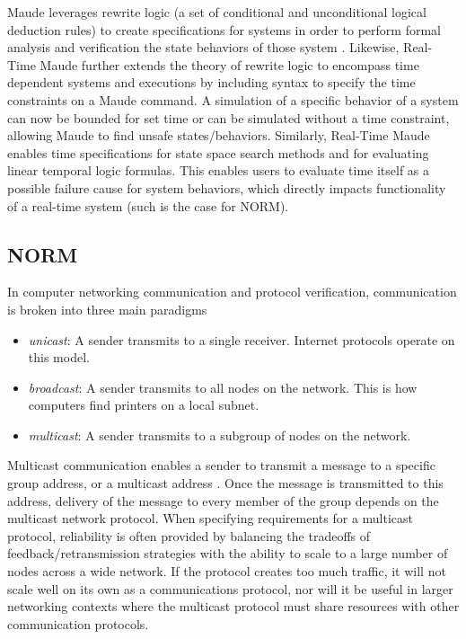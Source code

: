 \documentclass[10pt, journal]{IEEEtran}
\begin{document}
Maude leverages rewrite logic (a set of conditional and unconditional logical deduction rules) to create specifications for systems in order to perform formal analysis and verification the state behaviors of those system \cite{Meseguer1992}. Likewise, Real-Time Maude further extends the theory of rewrite logic to encompass time dependent systems and executions by including syntax to specify the time constraints on a Maude command. A simulation of a specific behavior of a system can now be bounded for set time or can be simulated without a time constraint, allowing Maude to find unsafe states/behaviors. Similarly, Real-Time Maude enables time specifications for state space search methods and for evaluating linear temporal logic formulas. This enables users to evaluate time itself as a possible failure cause for system behaviors, which directly impacts functionality of a real-time system (such is the case for NORM).

\subsection{NORM}
In computer networking communication and protocol verification, communication is broken into three main paradigms
\begin{itemize}
	\item \textit{unicast}: A sender transmits to a single receiver. Internet protocols operate on this model.
	\item \textit{broadcast}: A sender transmits to all nodes on the network. This is how computers find printers on a local subnet.
	\item \textit{multicast}: A sender transmits to a subgroup of nodes on the network.
\end{itemize}

Multicast communication enables a sender to transmit a message to a specific group address, or a multicast address \cite{Lien2004}. Once the message is transmitted to this address, delivery of the message to every member of the group depends on the multicast network protocol. When specifying requirements for a multicast protocol, reliability is often provided by balancing the tradeoffs of feedback/retransmission strategies with the ability to scale to a large number of nodes across a wide network. If the protocol creates too much traffic, it will not scale well on its own as a communications protocol, nor will it be useful in larger networking contexts where the multicast protocol must share resources with other communication protocols.
\end{document}

